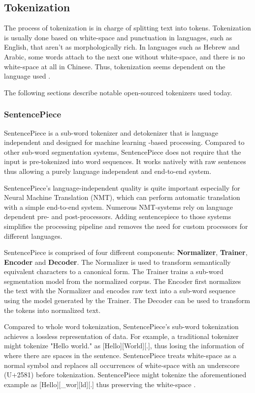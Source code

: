 \subsection{Tokenization} \label{Tokenization}
The process of tokenization is in charge of splitting text into tokens.
Tokenization is usually done based on white-space and punctuation in languages, such as English, that aren't as morphologically rich.
In languages such as Hebrew and Arabic, some words attach to the next one without white-space, and there is no white-space at all in Chinese.
Thus, tokenization seems dependent on the language used \cite{goldberg2017}.

The following sections describe notable open-sourced tokenizers used today.

\subsubsection{SentencePiece} \label{SentencePiece}

SentencePiece is a sub-word tokenizer and detokenizer that is language independent and designed for machine learning -based processing. \cite{kudo2018}
Compared to other sub-word segmentation systems, SentencePiece does not require that the input is pre-tokenized into word sequences.
It works natively with raw sentences thus allowing a purely language independent and end-to-end system.

SentencePiece's language-independent quality is quite important especially for Neural Machine Translation (NMT), which can perform automatic translation with a simple end-to-end system.
Numerous NMT-systems rely on language dependent pre- and post-processors.
Adding sentencepiece to those systems simplifies the processing pipeline and removes the need for custom processors for different languages.

SentencePiece is comprised of four different components: \textbf{Normalizer}, \textbf{Trainer}, \textbf{Encoder} and \textbf{Decoder}.
The Normalizer is used to transform semantically equivalent characters to a canonical form.
The Trainer trains a sub-word segmentation model from the normalized corpus.
The Encoder first normalizes the text with the Normalizer and encodes raw text into a sub-word sequence using the model generated by the Trainer.
The Decoder can be used to transform the tokens into normalized text. \cite{kudo2018}

Compared to whole word tokenization, SentencePiece's sub-word tokenization achieves a lossless representation of data.
For example, a traditional tokenizer might tokenize "Hello world." as [Hello][World][.], thus losing the information of where there are spaces in the sentence.
SentencePiece treats white-space as a normal symbol and replaces all occurrences of white-space with an underscore (U+2581) before tokenization.
SentencePiece might tokenize the aforementioned example as [Hello][\_wor][ld][.] thus preserving the white-space \cite{kudo2018}.

